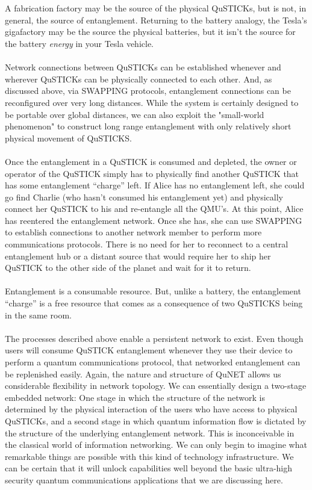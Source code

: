 \documentclass[aps,prl,twocolumn,10pt,nofootinbib]{revtex4}
\begin{document}
\\
\\
A fabrication factory may be the source of the physical QuSTICKs, but is not, in general, the source of entanglement.  Returning to the battery analogy, the Tesla's gigafactory may be the source the physical batteries, but it isn't the source for the battery {\em energy} in your Tesla vehicle.  
\\
\\
Network connections between QuSTICKs can be established whenever and wherever QuSTICKs can be physically connected to each other. And, as discussed above, via SWAPPING protocols, entanglement connections can be reconfigured over very long distances.  While the system is certainly designed to be portable over global distances, we can also exploit the "small-world phenomenon" to construct long range entanglement with only relatively short physical movement of QuSTICKS.  
\\
\\
Once the entanglement in a QuSTICK is consumed and depleted, the owner or operator of the QuSTICK simply has to physically find another QuSTICK that has some entanglement ``charge'' left. If Alice has no entanglement left, she could go find Charlie (who hasn't consumed his entanglement yet) and physically connect her QuSTICK to his and re-entangle all the QMU's.  At this point, Alice has reentered the entanglement network.  Once she has, she can use SWAPPING to establish connections to another network member to perform more communications protocols.  There is no need for her to reconnect to a central entanglement hub or a distant source that would require her to ship her QuSTICK to the other side of the planet and wait for it to return. 
\\
\\
Entanglement is a consumable resource.  But, unlike a battery, the entanglement ``charge'' is a free resource that comes as a consequence of two QuSTICKS being in the same room. 
\\
\\
The processes described above enable a persistent network to exist.  Even though users will consume QuSTICK entanglement whenever they use their device to perform a quantum communications protocol, that networked entanglement can be replenished easily.  Again, the nature and structure of QuNET allows us considerable flexibility in network topology.  We can essentially design a two-stage embedded network: One stage in which the structure of the network is determined by the physical interaction of the users who have access to physical QuSTICKs, and a second stage in which quantum information flow is dictated by the structure of the underlying entanglement network.  This is inconceivable in the classical world of information networking.  We can only begin to imagine what remarkable things are possible with this kind of technology infrastructure.  We can be certain that it will unlock capabilities well beyond the basic ultra-high security quantum communications applications that we are discussing here. 
\end{document}
